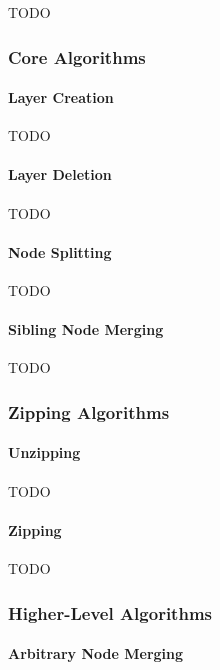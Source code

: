 TODO

\subsubsection{Core Algorithms}

\paragraph{Layer Creation}

TODO

\paragraph{Layer Deletion}

TODO

\paragraph{Node Splitting}

TODO

\paragraph{Sibling Node Merging}

TODO

\subsubsection{Zipping Algorithms}

\paragraph{Unzipping}

TODO

\paragraph{Zipping}

TODO

\subsubsection{Higher-Level Algorithms}

\paragraph{Arbitrary Node Merging}

